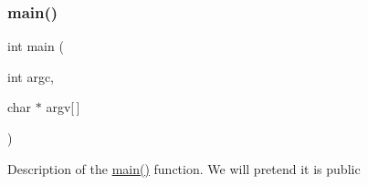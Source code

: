 \mbox{\label{fsti-main_8c_a0ddf1224851353fc92bfbff6f499fa97}} 
\subsubsection{\texorpdfstring{main()}{main()}}
{\footnotesize\ttfamily int main (\begin{DoxyParamCaption}\item[{int}]{argc,  }\item[{char $\ast$}]{argv\mbox{[}$\,$\mbox{]} }\end{DoxyParamCaption})}

Description of the \mbox{\hyperlink{fsti-main_8c_a0ddf1224851353fc92bfbff6f499fa97}{main()}} function. We will pretend it is public 